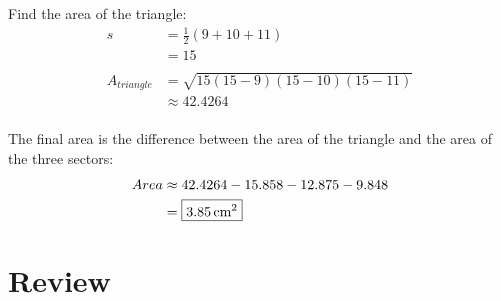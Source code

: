 \documentclass{exam}
\begin{document}
\begin{description}
        Find the area of the triangle:
        \begin{align*}
          s  & = \frac{1}{2}(9 + 10 + 11) \\
             & = 15 \\
          \\
          A_{triangle} & = \sqrt{15 (15 - 9)(15 - 10) (15 - 11)} \\
                       & \approx 42.4264 \\
        \end{align*}

        The final area is the difference between the area of the triangle and the area of the three sectors:
        \begin{align*}
          Area & \approx 42.4264 - 15.858 - 12.875 - 9.848 \\
               & = \boxed{ \unit[3.85]{cm^2} } \\
        \end{align*}

    \end{description}

    \pagebreak
  \fi

  \section{Review}
\end{document}
